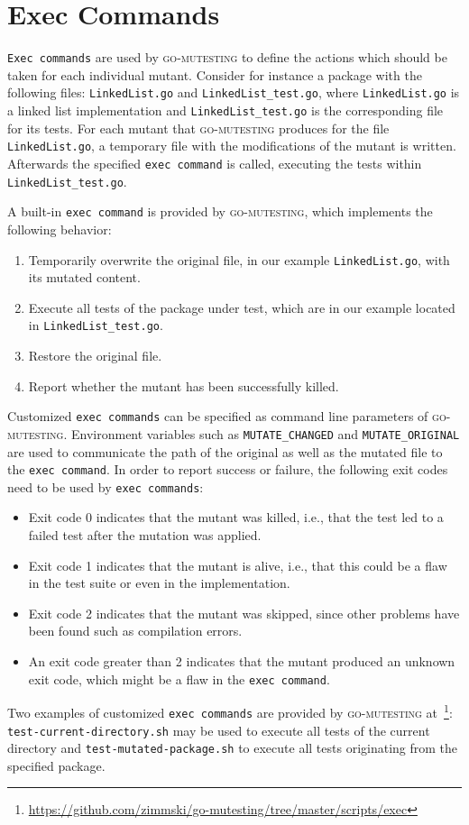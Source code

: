 \section{Exec Commands}
\label{sec:goMutestingExecCommands}

\texttt{Exec commands} are used by \textsc{go-mutesting} to define the actions which should be taken for each individual mutant. Consider for instance a package with the following files: \texttt{LinkedList.go} and \texttt{LinkedList\_test.go}, where \texttt{LinkedList.go} is a linked list implementation and \texttt{LinkedList\_test.go} is the corresponding file for its tests. For each mutant that \textsc{go-mutesting} produces for the file \texttt{LinkedList.go}, a temporary file with the modifications of the mutant is written. Afterwards the specified \texttt{exec command} is called, executing the tests within \texttt{LinkedList\_test.go}.

A built-in \texttt{exec command} is provided by \textsc{go-mutesting}, which implements the following behavior:

\begin{enumerate}
\item Temporarily overwrite the original file, in our example \texttt{LinkedList.go}, with its mutated content.
\item Execute all tests of the package under test, which are in our example located in \texttt{LinkedList\_test.go}.
\item Restore the original file.
\item Report whether the mutant has been successfully killed.
\end{enumerate}

Customized \texttt{exec commands} can be specified as command line parameters of \textsc{go-mutesting}. Environment variables such as \texttt{MUTATE\_CHANGED} and \texttt{MUTATE\_ORIGINAL} are used to communicate the path of the original as well as the mutated file to the \texttt{exec command}. In order to report success or failure, the following exit codes need to be used by \texttt{exec commands}:
\begin{itemize}
\item Exit code 0 indicates that the mutant was killed, i.e., that the test led to a failed test after the mutation was applied.
\item Exit code 1 indicates that the mutant is alive, i.e., that this could be a flaw in the test suite or even in the implementation.
\item Exit code 2 indicates that the mutant was skipped, since other problems have been found such as compilation errors.
\item An exit code greater than 2 indicates that the mutant produced an unknown exit code, which might be a flaw in the \texttt{exec command}.
\end{itemize}

Two examples of customized \texttt{exec commands} are provided by \textsc{go-mutesting} at~\footnote{\url{https://github.com/zimmski/go-mutesting/tree/master/scripts/exec}}: \texttt{test-current-directory.sh} may be used to execute all tests of the current directory and \texttt{test-mutated-package.sh} to execute all tests originating from the specified package.

